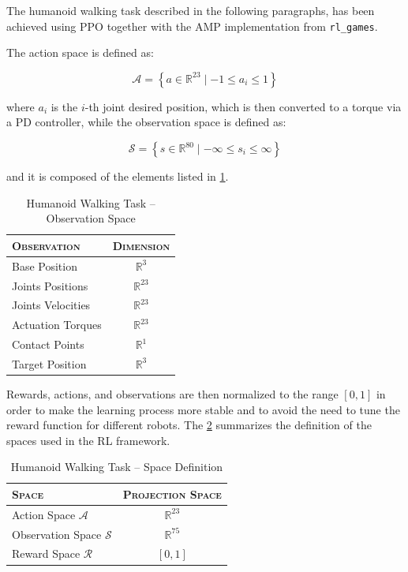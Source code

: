 The humanoid walking task described in the following paragraphs, has been achieved using \ac{PPO} together with the \ac{AMP} implementation from \texttt{rl\_games}.

The action space is defined as:

\begin{equation}
    \mathcal{A} = \left\{ a \in \mathbb{R} ^{23} \mid -1 \leq a_i \leq 1 \right\}
\end{equation}

where $a_i$ is the $i$-th joint desired position, which is then converted to a torque via a PD controller, while the observation space is defined as:

\begin{equation}
    \mathcal{S} = \left\{ s \in \mathbb{R} ^{80} \mid -\infty \leq s_i \leq \infty \right\}
\end{equation}

and it is composed of the elements listed in \cref{tab:walkingobs}.

\begin{table}
    \centering
    \label{tab:walkingobs}
    \begin{tabular}{l c}
        \toprule
        \textsc{Observation} & \textsc{Dimension} \\
        \midrule
        Base Position        & $\mathbb{R} ^{3}$  \\
        Joints Positions     & $\mathbb{R} ^{23}$ \\
        Joints Velocities    & $\mathbb{R} ^{23}$ \\
        Actuation Torques    & $\mathbb{R} ^{23}$ \\
        Contact Points       & $\mathbb{R} ^{1}$  \\
        Target Position      & $\mathbb{R} ^{3}$  \\
        \bottomrule
    \end{tabular}
    \caption{Humanoid Walking Task -- Observation Space}
\end{table}

Rewards, actions, and observations are then normalized to the range $[0,1]$ in order to make the learning process more stable and to avoid the need to tune the reward function for different robots. The \cref{tab:walkingtaskspacedef} summarizes the definition of the spaces used in the \ac{RL} framework.

\begin{table}
    \centering
    \begin{tabular}{l c}
        \toprule
        \textsc{Space}                  & \textsc{Projection Space} \\
        \midrule
        Action Space $\mathcal{A}$      & $\mathbb{R} ^{23}$        \\
        Observation Space $\mathcal{S}$ & $\mathbb{R} ^{75}$        \\
        Reward Space $\mathcal{R}$      & $[0,1]$                   \\
        \bottomrule
    \end{tabular}
    \caption{Humanoid Walking Task -- Space Definition}
    \label{tab:walkingtaskspacedef}
\end{table}


